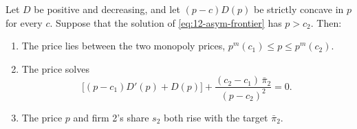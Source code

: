 \begin{proposition}\label{prop:12-asym-sharing}
Let $D$ be positive and decreasing, and let $(p - c)D(p)$ be strictly concave in $p$ for every $c$. Suppose that the
solution of \eqref{eq:12-asym-frontier} has $p > c_2$. Then:
\begin{enumerate}[label=(\roman*)]
\item The price lies between the two monopoly prices, $p^m(c_1) \le p \le p^m(c_2)$.
\item The price solves
\begin{equation}\label{eq:12-asym-foc}
\bigl[(p - c_1)D'(p) + D(p)\bigr] + \frac{(c_2 - c_1)\,\bar\pi_2}{(p - c_2)^2} = 0 .
\end{equation}
\item The price $p$ and firm 2's share $s_2$ both rise with the target $\bar\pi_2$.
\end{enumerate}
\end{proposition}

